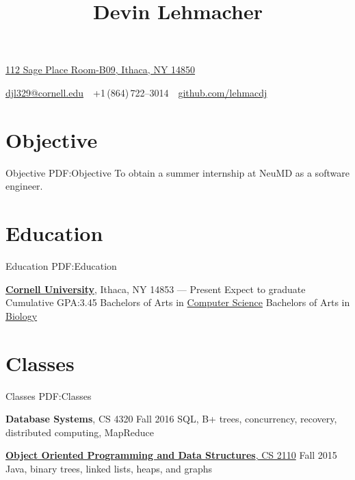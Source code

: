 \documentclass[letterpaper,10pt,oneside]{simpleresume}
\newcommand{\CVAuthor}{Devin Lehmacher}
\newcommand{\CVCompany}{NeuMD}
\newcommand{\CVWebpage}{github.com/lehmacdj}
\begin{document}
\begin{minipage}[t][0pt]{\linewidth}
\pagestyle{empty}

\title{\CVAuthor}

\begin{subtitle}
\href{https://www.google.com/maps/place/112+Sage+Pl+Room-B09,+Ithaca,+NY+14850}
{112 Sage Place Room-B09, Ithaca, NY 14850}
\par
\href{mailto:djl329@cornell.edu}
{djl329@cornell.edu}
\,\SubBulletSymbol\,
+1\,(864)\,722--3014
\,\SubBulletSymbol\,
\href{https://\CVWebpage}
{\CVWebpage}
\end{subtitle}

\begin{body}

\section%
{Objective}
{Objective}
{PDF:Objective}
To obtain a summer internship at \CVCompany{} as a software engineer.

\section%
{Education}
{Education}
{PDF:Education}

\href{https://www.cornell.edu}
{\textbf{Cornell University}},
Ithaca, NY 14853
\hfill
{} --- Present
\BulletItem%
Expect to graduate 
\BulletItem%
Cumulative GPA:\@ 3.45
\BulletItem%
Bachelors of Arts in
\href{https://www.cs.cornell.edu}{Computer Science}
\BulletItem%
Bachelors of Arts in
\href{https://www.biology.cornell.edu}{Biology}

\section%
{Classes}
{Classes}
{PDF:Classes}

\textbf{Database Systems}, CS 4320
\hfill Fall 2016
\BulletItem%
SQL, B+ trees, concurrency, recovery, distributed computing, MapReduce

\href{https://www.cs.cornell.edu/courses/cs2110/2015fa/}
{\textbf{Object Oriented Programming and Data Structures}, CS 2110}
\hfill Fall 2015
\BulletItem%
Java, binary trees, linked lists, heaps, and graphs


\end{body}
\end{minipage}
\end{document}
